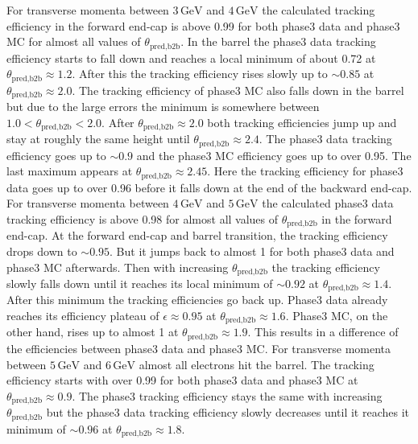 \documentclass[a4paper,11pt,twosided,final,german,openbib,pdftex,listof=totoc,bibliography=totoc]{scrbook}
\begin{document}
For transverse momenta between $3\,\textrm{GeV}$ and $4\,\textrm{GeV}$ the calculated tracking efficiency in the forward end-cap is above 0.99 for both phase3 data and phase3 MC for almost all values of $\theta_{\textrm{pred,b2b}}$. In the barrel the phase3 data tracking efficiency starts to fall down and reaches a local minimum of about 0.72 at $\theta_{\textrm{pred,b2b}} \approx 1.2$. After this the tracking efficiency rises slowly up to $\sim 0.85$ at $\theta_{\textrm{pred,b2b}} \approx 2.0$. The tracking efficiency of phase3 MC also falls down in the barrel but due to the large errors the minimum is somewhere between $1.0 < \theta_{\textrm{pred,b2b}} < 2.0$. After $\theta_{\textrm{pred,b2b}} \approx 2.0$ both tracking efficiencies jump up and stay at roughly the same height until $\theta_{\textrm{pred,b2b}} \approx 2.4$. The phase3 data tracking efficiency goes up to $\sim 0.9$ and the phase3 MC efficiency goes up to over 0.95. The last maximum appears at $\theta_{\textrm{pred,b2b}} \approx 2.45$. Here the tracking efficiency for phase3 data goes up to over 0.96 before it  falls down at the end of the backward end-cap.
For transverse momenta between $4\,\textrm{GeV}$ and $5\,\textrm{GeV}$ the calculated phase3 data tracking efficiency is above 0.98 for almost all values of $\theta_{\textrm{pred,b2b}}$ in the forward end-cap. At the forward end-cap and barrel transition, the tracking efficiency drops down to $\sim 0.95$. But it jumps back to almost 1 for both phase3 data and phase3 MC afterwards. Then with increasing $\theta_{\textrm{pred,b2b}}$ the tracking efficiency slowly falls down until it reaches its local minimum of $\sim 0.92$ at $\theta_{\textrm{pred,b2b}} \approx 1.4$. After this minimum the tracking efficiencies go back up. Phase3 data already reaches its efficiency plateau of $\epsilon \approx 0.95 $ at $\theta_{\textrm{pred,b2b}} \approx 1.6$. Phase3 MC, on the other hand, rises up to  almost 1 at $\theta_{\textrm{pred,b2b}} \approx 1.9$. This results in a difference of the efficiencies between phase3 data and phase3 MC.
For transverse momenta between $5\,\textrm{GeV}$ and $6\,\textrm{GeV}$ almost all electrons hit the barrel. The tracking efficiency starts with over 0.99 for both phase3 data and phase3 MC at $\theta _{\textrm{pred,b2b}}\approx 0.9$. The phase3 tracking efficiency stays the same with increasing $\theta_{\textrm{pred,b2b}}$ but the phase3 data tracking efficiency slowly decreases until it reaches it minimum of $\sim 0.96$ at $\theta_{\textrm{pred,b2b}} \approx 1.8$.
\end{document}

